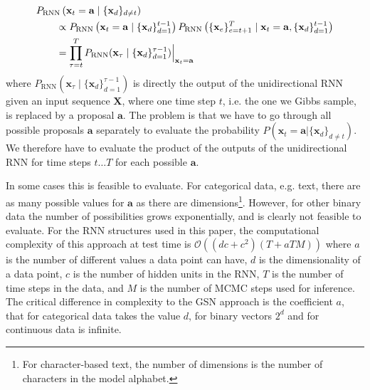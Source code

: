 \documentclass{article}
\begin{document}
\begin{align}
\hspace{2em}&\hspace{-2em} P_{\mathrm{RNN}}\left( \mathbf{x}_{t} = \mathbf{a} \mid \{\mathbf{x}_{d}\}_{d\neq t} \right) 
\\ 
& \propto P_{\mathrm{RNN}} \left( \mathbf{x}_t = \mathbf{a} \mid \{\mathbf{x}_d\}_{d=1}^{t-1} 
\right) P_{\mathrm{RNN}} \left(\{\mathbf{x}_e\}_{e=t+1}^{T} \mid \mathbf{x}_t = 
\mathbf{a}, \{\mathbf{x}_d\}_{d=1}^{t-1} \right) \\
&= \prod_{\tau=t}^T P_{\mathrm{RNN}}(\mathbf{x}_{\tau} \mid \{\mathbf{x}_d\}_{d=1}^{\tau-1}) \Bigr|_{\mathbf{x}_t=\mathbf{a}}
\label{eq:onewayrnn}
\end{align}
where $P_{\mathrm{RNN}}(\mathbf{x}_{\tau} \mid \{\mathbf{x}_d\}_{d=1}^{\tau-1})$ is directly 
the output of the unidirectional RNN given an input sequence $\mathbf{X}$, 
where one time step $t$, i.e. the one we Gibbs sample, is replaced by a proposal 
$\mathbf{a}$. The problem is that we have to go through all possible proposals 
$\mathbf{a}$ separately to evaluate the probability $P\left( \mathbf{x}_{t} = 
\mathbf{a} | \{\mathbf{x}_d\}_{d\neq t} \right)$. We therefore have to evaluate 
the product of the outputs of the unidirectional RNN for time steps $t \ldots 
T$ for each possible $\mathbf{a}$.

In some cases this is feasible to evaluate. For categorical data, 
e.g. text, there are as many possible values for $\mathbf{a}$ as there are 
dimensions\footnote{For character-based text, the number of dimensions is the 
number of characters in the model alphabet.}. However, for other binary data the 
number of possibilities grows exponentially, and is clearly not feasible to 
evaluate. For the RNN structures used in this paper, the computational complexity 
of this approach at test time is $\mathcal{O}((dc+c^2)(T+aTM))$ where $a$ is the 
number of different values a data point can have, $d$ is the dimensionality of a 
data point, $c$ is the number of hidden units in the RNN, $T$ is the number of 
time steps in the data, and $M$ is the number of MCMC steps used for inference. 
The critical difference in complexity to the GSN approach is the coefficient 
$a$, that for categorical data takes the value $d$, for binary vectors $2^d$ and 
for continuous data is infinite.
\end{document}
